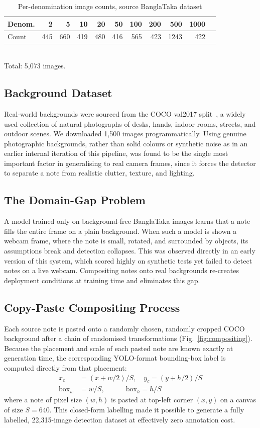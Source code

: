 \documentclass[10pt,twocolumn]{article}
\begin{document}
\begin{table}[h]
\centering
\small
\caption{Per-denomination image counts, source BanglaTaka dataset}
\label{tab:source}
\begin{tabular}{@{}lrrrrrrrrrr@{}}
\toprule
Denom. & 2 & 5 & 10 & 20 & 50 & 100 & 200 & 500 & 1000 \\
\midrule
Count & 445 & 660 & 419 & 480 & 416 & 565 & 423 & 1243 & 422 \\
\bottomrule
\end{tabular}
\vspace{2pt}
\\\footnotesize Total: 5,073 images.
\end{table}

\subsection{Background Dataset}
Real-world backgrounds were sourced from the COCO val2017 split~\cite{ref_coco}, a widely used collection of natural photographs of desks, hands, indoor rooms, streets, and outdoor scenes. We downloaded 1,500 images programmatically. Using genuine photographic backgrounds, rather than solid colours or synthetic noise as in an earlier internal iteration of this pipeline, was found to be the single most important factor in generalising to real camera frames, since it forces the detector to separate a note from realistic clutter, texture, and lighting.

\subsection{The Domain-Gap Problem}
A model trained only on background-free BanglaTaka images learns that a note fills the entire frame on a plain background. When such a model is shown a webcam frame, where the note is small, rotated, and surrounded by objects, its assumptions break and detection collapses. This was observed directly in an early version of this system, which scored highly on synthetic tests yet failed to detect notes on a live webcam. Compositing notes onto real backgrounds re-creates deployment conditions at training time and eliminates this gap.

\subsection{Copy-Paste Compositing Process}
Each source note is pasted onto a randomly chosen, randomly cropped COCO background after a chain of randomised transformations (Fig.~\ref{fig:compositing}). Because the placement and scale of each pasted note are known exactly at generation time, the corresponding YOLO-format bounding-box label is computed directly from that placement:
\begin{align}
x_c &= (x + w/2)/S, \quad y_c = (y + h/2)/S \\
\text{box}_w &= w/S, \qquad\quad \text{box}_h = h/S
\end{align}
where a note of pixel size $(w,h)$ is pasted at top-left corner $(x,y)$ on a canvas of size $S=640$. This closed-form labelling made it possible to generate a fully labelled, 22,315-image detection dataset at effectively zero annotation cost.
\end{document}
